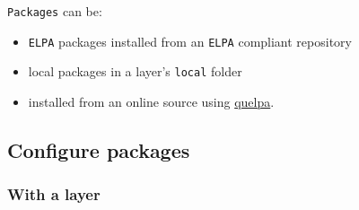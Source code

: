 \documentclass[11pt]{article}
\begin{document}
\texttt{Packages} can be:
\begin{itemize}
\item \texttt{ELPA} packages installed from an \texttt{ELPA} compliant repository
\item local packages in a layer's \texttt{local} folder
\item installed from an online source using \href{https://github.com/quelpa/quelpa}{quelpa}.
\end{itemize}

\subsection{Configure packages}
\label{sec:orgc3529e4}
\subsubsection{With a layer}
\label{sec:org5255067}
\end{document}
